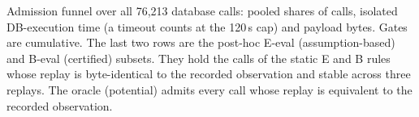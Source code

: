 \begin{table}[htbp]
  \caption{Admission funnel over all 76,213 database calls: pooled shares of calls, isolated DB-execution time (a
  timeout counts at the 120\,s cap) and payload bytes. Gates are cumulative. The last two rows are the post-hoc E-eval
  (assumption-based) and B-eval (certified) subsets. They hold the calls of the static E and B rules whose replay is
  byte-identical to the recorded observation and stable across three replays. The oracle (potential) admits every call
  whose replay is equivalent to the recorded observation.}
  \label{tab:funnel}
  \small\setlength{\tabcolsep}{3pt}
  
\end{table}
